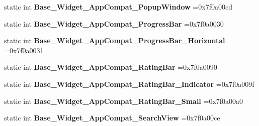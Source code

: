 \begin{DoxyCompactItemize}
static int {\bfseries Base\+\_\+\+Widget\+\_\+\+App\+Compat\+\_\+\+Popup\+Window} =0x7f0a00cd
\item 
\mbox{\label{classandroid_1_1support_1_1graphics_1_1drawable_1_1animated_1_1R_1_1style_a4cb0a96416ceb07b7c615b3ca0dc21f9}} 
static int {\bfseries Base\+\_\+\+Widget\+\_\+\+App\+Compat\+\_\+\+Progress\+Bar} =0x7f0a0030
\item 
\mbox{\label{classandroid_1_1support_1_1graphics_1_1drawable_1_1animated_1_1R_1_1style_a1bd9c509d54bc6dde1c1c65ab0c9be00}} 
static int {\bfseries Base\+\_\+\+Widget\+\_\+\+App\+Compat\+\_\+\+Progress\+Bar\+\_\+\+Horizontal} =0x7f0a0031
\item 
\mbox{\label{classandroid_1_1support_1_1graphics_1_1drawable_1_1animated_1_1R_1_1style_a86e0fde7ba5c8f2f867cca7f9eb44f62}} 
static int {\bfseries Base\+\_\+\+Widget\+\_\+\+App\+Compat\+\_\+\+Rating\+Bar} =0x7f0a0090
\item 
\mbox{\label{classandroid_1_1support_1_1graphics_1_1drawable_1_1animated_1_1R_1_1style_aaf4cf02f3a7b67610ae906a903add533}} 
static int {\bfseries Base\+\_\+\+Widget\+\_\+\+App\+Compat\+\_\+\+Rating\+Bar\+\_\+\+Indicator} =0x7f0a009f
\item 
\mbox{\label{classandroid_1_1support_1_1graphics_1_1drawable_1_1animated_1_1R_1_1style_a7a4dbd6ec8eff373a4e6a8c11702777c}} 
static int {\bfseries Base\+\_\+\+Widget\+\_\+\+App\+Compat\+\_\+\+Rating\+Bar\+\_\+\+Small} =0x7f0a00a0
\item 
\mbox{\label{classandroid_1_1support_1_1graphics_1_1drawable_1_1animated_1_1R_1_1style_ab06299b295651a1b90cb5999b1467f91}} 
static int {\bfseries Base\+\_\+\+Widget\+\_\+\+App\+Compat\+\_\+\+Search\+View} =0x7f0a00ce
\item 
\mbox{\label{classandroid_1_1support_1_1graphics_1_1drawable_1_1animated_1_1R_1_1style_aebd0e9d6322c8105cca6ff2bb0d41d3b}} 

\end{DoxyCompactItemize}
